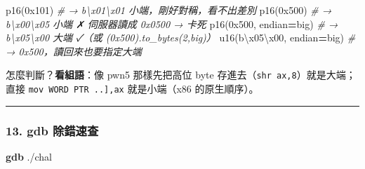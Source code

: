 \documentclass[10pt,a4paper]{article}
\newenvironment{Shaded}{\begin{snugshade}}{\end{snugshade}}
\newcommand{\BaseNTok}[1]{\textcolor[rgb]{0.00,0.00,0.81}{#1}}
\newcommand{\CharTok}[1]{\textcolor[rgb]{0.31,0.60,0.02}{#1}}
\newcommand{\CommentTok}[1]{\textcolor[rgb]{0.56,0.35,0.01}{\textit{#1}}}
\newcommand{\FunctionTok}[1]{\textcolor[rgb]{0.13,0.29,0.53}{\textbf{#1}}}
\newcommand{\NormalTok}[1]{#1}
\newcommand{\OperatorTok}[1]{\textcolor[rgb]{0.81,0.36,0.00}{\textbf{#1}}}
\newcommand{\StringTok}[1]{\textcolor[rgb]{0.31,0.60,0.02}{#1}}
\renewenvironment{Shaded}{%
  \def\FrameCommand{\fboxsep=3.2pt\colorbox{shadecolor}}%
  \MakeFramed{\advance\hsize-\width\FrameRestore\small}%
}{%
  \endMakeFramed
}
\renewenvironment{quote}{%
  \begin{mdframed}[linewidth=0pt,innerleftmargin=0pt,innerrightmargin=0pt,
    innerbottommargin=0pt,innertopmargin=0pt,skipabove=0.55em,skipbelow=0.55em,
    leftmargin=0.9em,rightmargin=0.4em,startcode={\color{quotebar}\vrule width 2.6pt},%
    endcode={}]%
  \itshape\color{black}%
}{%
  \end{mdframed}%
}
\begin{document}
\begin{Shaded}
\begin{Highlighting}[]
\NormalTok{p16(}\BaseNTok{0x101}\NormalTok{)                    }\CommentTok{\# → b\textquotesingle{}\textbackslash{}x01\textbackslash{}x01\textquotesingle{}  小端，剛好對稱，看不出差別}
\NormalTok{p16(}\BaseNTok{0x500}\NormalTok{)                    }\CommentTok{\# → b\textquotesingle{}\textbackslash{}x00\textbackslash{}x05\textquotesingle{}  小端 ✗ 伺服器讀成 0x0500 → 卡死}
\NormalTok{p16(}\BaseNTok{0x500}\NormalTok{, endian}\OperatorTok{=}\StringTok{\textquotesingle{}big\textquotesingle{}}\NormalTok{)      }\CommentTok{\# → b\textquotesingle{}\textbackslash{}x05\textbackslash{}x00\textquotesingle{}  大端 ✓（或 (0x500).to\_bytes(2,\textquotesingle{}big\textquotesingle{})）}
\NormalTok{u16(}\StringTok{b\textquotesingle{}}\CharTok{\textbackslash{}x05\textbackslash{}x00}\StringTok{\textquotesingle{}}\NormalTok{, endian}\OperatorTok{=}\StringTok{\textquotesingle{}big\textquotesingle{}}\NormalTok{)   }\CommentTok{\# → 0x500，讀回來也要指定大端}
\end{Highlighting}
\end{Shaded}

\begin{quote}
怎麼判斷？\textbf{看組語}：像 pwn5 那樣先把高位 byte
存進去（\texttt{shr\ \allowbreak{}ax,\allowbreak{}8}）就是大端； 直接
\texttt{mov\ \allowbreak{}WORD\ \allowbreak{}PTR\ \allowbreak{}{[}..{]},\allowbreak{}ax} 就是小端（x86 的原生順序）。
\end{quote}

\begin{center}\rule{0.5\linewidth}{0.5pt}\end{center}

\subsubsection{13. gdb 除錯速查}\label{gdb-ux9664ux932fux901fux67e5}

\begin{Shaded}
\begin{Highlighting}[]
\FunctionTok{gdb}\NormalTok{ ./chal}
\end{Highlighting}
\end{Shaded}
\end{document}
